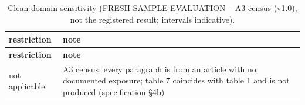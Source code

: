 \begingroup\footnotesize
\begin{longtable}{>{\raggedright\arraybackslash}p{109.0pt}>{\raggedright\arraybackslash}p{322.0pt}}
\caption{Clean-domain sensitivity (FRESH-SAMPLE EVALUATION -- A3 census (v1.0), not the registered result; intervals indicative).} \\
\toprule
\textbf{restriction} & \textbf{note} \\
\midrule
\endfirsthead
\toprule
\textbf{restriction} & \textbf{note} \\
\midrule
\endhead
\bottomrule
\endfoot
not applicable & A3 census:\allowbreak{} every paragraph is from an article with no documented exposure; table 7 coincides with table 1 and is not produced (specification §4b) \\
\end{longtable}
\endgroup
